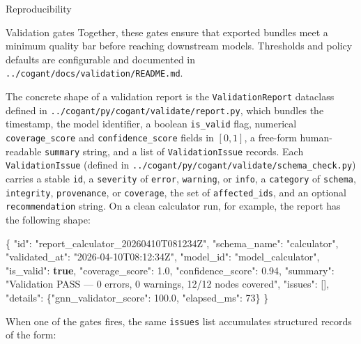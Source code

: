 \documentclass[
  ignorenonframetext,
]{beamer}
\newenvironment{Shaded}{}{}
\newcommand{\DataTypeTok}[1]{\textcolor[rgb]{0.56,0.13,0.00}{#1}}
\newcommand{\DecValTok}[1]{\textcolor[rgb]{0.25,0.63,0.44}{#1}}
\newcommand{\FloatTok}[1]{\textcolor[rgb]{0.25,0.63,0.44}{#1}}
\newcommand{\FunctionTok}[1]{\textcolor[rgb]{0.02,0.16,0.49}{#1}}
\newcommand{\KeywordTok}[1]{\textcolor[rgb]{0.00,0.44,0.13}{\textbf{#1}}}
\newcommand{\OtherTok}[1]{\textcolor[rgb]{0.00,0.44,0.13}{#1}}
\newcommand{\StringTok}[1]{\textcolor[rgb]{0.25,0.44,0.63}{#1}}
\begin{document}
\begin{frame}[fragile]{Reproducibility}
\begin{block}{Validation gates}
Together, these gates ensure that exported bundles meet a minimum
quality bar before reaching downstream models. Thresholds and policy
defaults are configurable and documented in
\texttt{../cogant/docs/validation/README.md}.

The concrete shape of a validation report is the
\texttt{ValidationReport} dataclass defined in
\texttt{../cogant/py/cogant/validate/report.py}, which bundles the
timestamp, the model identifier, a boolean \texttt{is\_valid} flag,
numerical \texttt{coverage\_score} and \texttt{confidence\_score} fields
in \([0, 1]\), a free-form human-readable \texttt{summary} string, and a
list of \texttt{ValidationIssue} records. Each \texttt{ValidationIssue}
(defined in \texttt{../cogant/py/cogant/validate/schema\_check.py})
carries a stable \texttt{id}, a \texttt{severity} of \texttt{error},
\texttt{warning}, or \texttt{info}, a \texttt{category} of
\texttt{schema}, \texttt{integrity}, \texttt{provenance}, or
\texttt{coverage}, the set of \texttt{affected\_ids}, and an optional
\texttt{recommendation} string. On a clean calculator run, for example,
the report has the following shape:

\begin{Shaded}
\begin{Highlighting}[]
\FunctionTok{\{}
  \DataTypeTok{"id"}\FunctionTok{:} \StringTok{"report\_calculator\_20260410T081234Z"}\FunctionTok{,}
  \DataTypeTok{"schema\_name"}\FunctionTok{:} \StringTok{"calculator"}\FunctionTok{,}
  \DataTypeTok{"validated\_at"}\FunctionTok{:} \StringTok{"2026{-}04{-}10T08:12:34Z"}\FunctionTok{,}
  \DataTypeTok{"model\_id"}\FunctionTok{:} \StringTok{"model\_calculator"}\FunctionTok{,}
  \DataTypeTok{"is\_valid"}\FunctionTok{:} \KeywordTok{true}\FunctionTok{,}
  \DataTypeTok{"coverage\_score"}\FunctionTok{:} \FloatTok{1.0}\FunctionTok{,}
  \DataTypeTok{"confidence\_score"}\FunctionTok{:} \FloatTok{0.94}\FunctionTok{,}
  \DataTypeTok{"summary"}\FunctionTok{:} \StringTok{"Validation PASS — 0 errors, 0 warnings, 12/12 nodes covered"}\FunctionTok{,}
  \DataTypeTok{"issues"}\FunctionTok{:} \OtherTok{[]}\FunctionTok{,}
  \DataTypeTok{"details"}\FunctionTok{:} \FunctionTok{\{}\DataTypeTok{"gnn\_validator\_score"}\FunctionTok{:} \FloatTok{100.0}\FunctionTok{,} \DataTypeTok{"elapsed\_ms"}\FunctionTok{:} \DecValTok{73}\FunctionTok{\}}
\FunctionTok{\}}
\end{Highlighting}
\end{Shaded}

When one of the gates fires, the same \texttt{issues} list accumulates
structured records of the form:


\end{block}
\end{frame}
\end{document}
